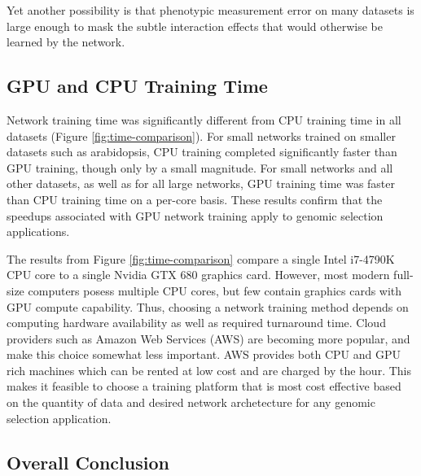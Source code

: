 Yet another possibility is that phenotypic measurement error on many datasets is large enough 
to mask the subtle interaction effects that would otherwise be learned by the network.

\ifdefined\showtablesandfigures
\fi

\subsection*{GPU and CPU Training Time}

Network training time was significantly different from CPU training time in all datasets 
(Figure \ref{fig:time-comparison}).  For small networks trained on smaller datasets 
such as arabidopsis, CPU training completed significantly faster than GPU training, 
though only by a small magnitude. For small networks and all other datasets, as well 
as for all large networks, GPU training time was faster than CPU training time on a 
per-core basis. These results confirm that the speedups associated 
with GPU network training apply to genomic selection applications.  



The results from Figure \ref{fig:time-comparison} compare a single Intel i7-4790K CPU 
core to a single Nvidia GTX 680 graphics card. However, most modern full-size computers posess 
multiple CPU cores, but few contain graphics cards with GPU compute capability. 
Thus, choosing a network training method depends on computing hardware availability 
as well as required turnaround time. Cloud providers such as Amazon Web Services (AWS) 
are becoming more popular, and make this choice somewhat less important. AWS 
provides both CPU and GPU rich machines which can be rented at low cost and 
are charged by the hour. This makes it feasible to choose a training platform 
that is most cost effective based on the quantity of data and desired network 
archetecture for any genomic selection application.

\ifdefined\showtablesandfigures
\fi

\subsection*{Overall Conclusion}

